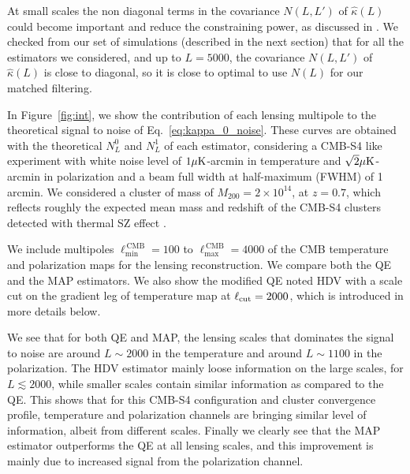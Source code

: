 \documentclass[prd, superscriptaddress, tightenlines, longbibliography, nofootinbib, eqsecnum, amsfonts, amsmath, floatfix, twocolumn, notitlepage]{revtex4-2}
\begin{document}
 At small scales the non diagonal terms in the covariance  $N(L, L')$ of $\hat \kappa(L)$ could become important and reduce the constraining power, as discussed in \cite{Horowitz:2017iql}.
 We checked from our set of simulations (described in the next section) that for all the estimators we considered, and up to $L=5000$, the covariance $N(L, L')$ of $\hat \kappa(L)$ is close to diagonal, so it is close to optimal to use $N(L)$ for our matched filtering.

In Figure~\ref{fig:int}, we show the contribution of each lensing multipole to the theoretical signal to noise of Eq.~\ref{eq:kappa_0_noise}. These curves are obtained with the theoretical $N_L^0$ and $N_L^1$ of each estimator, considering a  CMB-S4 like experiment with white noise level of $1 \mu \rm{K}$-arcmin in temperature and $\sqrt{2} \mu \rm{K}$-arcmin in polarization and a beam full width at half-maximum (FWHM) of 1 arcmin.
We considered a cluster of mass of $M_{200} = 2\times 10^{14}$, at $z=0.7$, which reflects roughly the expected mean mass and redshift of the CMB-S4 clusters detected with thermal SZ effect \cite{CMB-S4:2016ple}. 

We include multipoles $\ell_{\text{min}}^{\, \text{CMB}} = 100$ to $\ell_{\text{max}}^{\, \text{CMB}} = 4000$ of the CMB temperature and polarization maps for the lensing reconstruction. 
We compare both the QE and the MAP estimators. We also show the modified QE noted HDV \cite{Hu:2007bt} with a scale cut on the gradient leg of temperature map at $\ell_{\rm cut}=2000$, which is introduced in more details below.

We see that for both QE and MAP, the lensing scales that dominates the signal to noise are around $L\sim 2000$ in the temperature and around  $L\sim 1100$ in the polarization. The HDV estimator mainly loose information on the large scales, for $L \lesssim 2000$, while smaller scales contain similar information as compared to the QE.
This shows that for this CMB-S4 configuration and cluster convergence profile, temperature and polarization channels are bringing similar level of information, albeit from different scales.  
Finally we clearly see that the MAP estimator outperforms the QE at all lensing scales, and this improvement is mainly due to increased signal from the polarization channel. 
\end{document}

